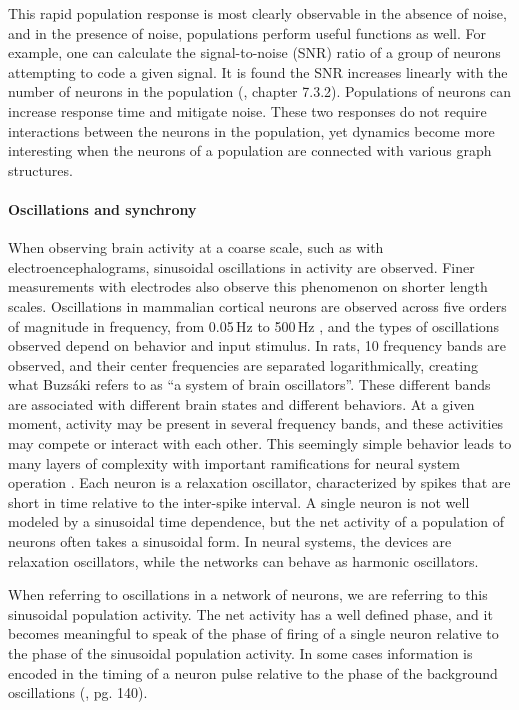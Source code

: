 This rapid population response is most clearly observable in the absence of noise, and in the presence of noise, populations perform useful functions as well. For example, one can calculate the signal-to-noise (SNR) ratio of a group of neurons attempting to code a given signal. It is found the SNR increases linearly with the number of neurons in the population (\cite{geki2002}, chapter 7.3.2). Populations of neurons can increase response time and mitigate noise. These two responses do not require interactions between the neurons in the population, yet dynamics become more interesting when the neurons of a population are connected with various graph structures.

\paragraph{\label{sec:oscillations_and_synchrony}Oscillations and synchrony}
When observing brain activity at a coarse scale, such as with electroencephalograms, sinusoidal oscillations in activity are observed. Finer measurements with electrodes also observe this phenomenon on shorter length scales. Oscillations in mammalian cortical neurons are observed across five orders of magnitude in frequency, from 0.05\,Hz to 500\,Hz \cite{budr2004}, and the types of oscillations observed depend on behavior and input stimulus. In rats, 10 frequency bands are observed, and their center frequencies are separated logarithmically, creating what Buzs\'{a}ki refers to as ``a system of brain oscillators''. These different bands are associated with different brain states and different behaviors. At a given moment, activity may be present in several frequency bands, and these activities may compete or interact with each other.   This seemingly simple behavior leads to many layers of complexity with important ramifications for neural system operation \cite{bu2006}. Each neuron is a relaxation oscillator, characterized by spikes that are short in time relative to the inter-spike interval. A single neuron is not well modeled by a sinusoidal time dependence, but the net activity of a population of neurons often takes a sinusoidal form. In neural systems, the devices are relaxation oscillators, while the networks can behave as harmonic oscillators. 

When referring to oscillations in a network of neurons, we are referring to this sinusoidal population activity. The net activity has a well defined phase, and it becomes meaningful to speak of the phase of firing of a single neuron relative to the phase of the sinusoidal population activity. In some cases information is encoded in the timing of a neuron pulse relative to the phase of the background oscillations (\cite{geki2002}, pg. 140).

